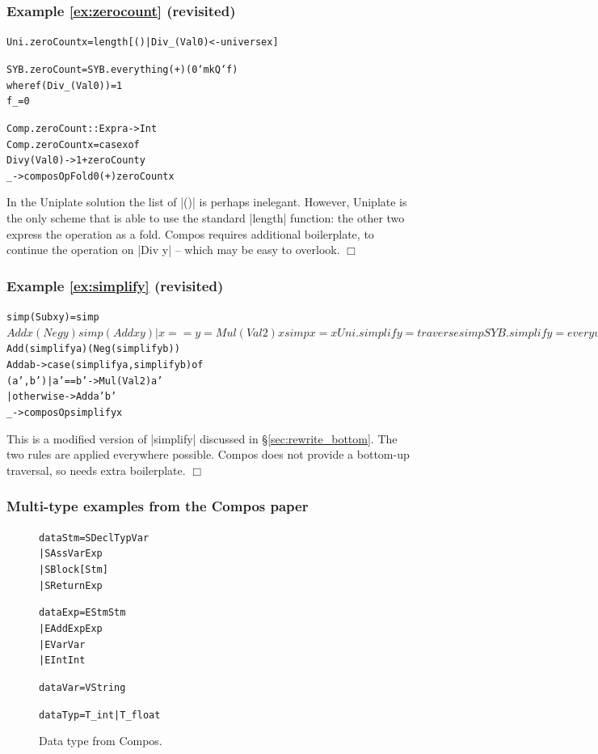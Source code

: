 \documentclass[preprint]{sigplanconf}
\newcommand{\noexample}{\hfill$\Box$}
\newenvironment{code}{\begin{alltt}\small}{\end{alltt}}
\newenvironment{revisit}[1]{\subsubsection*{Example #1 (revisited)}}{\noexample}
\begin{document}
\begin{revisit}{\ref{ex:zerocount}}

\begin{code}
Uni.zeroCount x = length [() | Div _ (Val 0) <- universe x]

SYB.zeroCount = SYB.everything (+) (0 `mkQ` f)
    where  f (Div _ (Val 0))  = 1
           f _                = 0

Comp.zeroCount :: Expr a -> Int
Comp.zeroCount x = case x of
    Div y (Val 0) -> 1 + zeroCount y
    _ -> composOpFold 0 (+) zeroCount x
\end{code}

In the Uniplate solution the list of |()| is perhaps inelegant. However, Uniplate is the only scheme that is able to use the standard |length| function: the other two express the operation as a fold. Compos requires additional boilerplate, to continue the operation on |Div y| -- which may be easy to overlook.
\end{revisit}

\begin{revisit}{\ref{ex:simplify}}

\begin{code}
simp (Sub x y)           = simp $ Add x (Neg y)
simp (Add x y) | x == y  = Mul (Val 2) x
simp x                   = x

Uni.simplify = traverse simp

SYB.simplify = everywhere (mkT simp)

Comp.simplify :: Expr a -> Expr a
Comp.simplify x = case x of
    Sub  a b -> simplify $ Add (simplify a) (Neg (simplify b))
    Add  a b -> case  (simplify a, simplify b) of
                      (a',b')  | a' == b'   -> Mul (Val 2) a'
                               | otherwise  -> Add a' b'
    _ -> composOp simplify x
\end{code}

This is a modified version of |simplify| discussed in \S\ref{sec:rewrite_bottom}. The two rules are applied everywhere possible. Compos does not provide a bottom-up traversal, so needs extra boilerplate.
\end{revisit}

\subsubsection{Multi-type examples from the Compos paper}

\begin{figure}
\begin{code}
data Stm  =  SDecl    Typ Var
          |  SAss     Var Exp
          |  SBlock   [Stm]
          |  SReturn  Exp

data Exp  =  EStm  Stm
          |  EAdd  Exp Exp
          |  EVar  Var
          |  EInt  Int

data Var  =  V String

data Typ  =  T_int | T_float
\end{code}
\caption{Data type from Compos.}
\label{fig:compos}
\end{figure}
\end{document}
